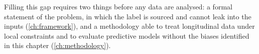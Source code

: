 Filling this gap requires two things before any data are analysed: a formal statement of the problem, in which the label is sourced and cannot leak into the inputs (\cref{ch:framework}), and a methodology able to treat longitudinal data under local constraints and to evaluate predictive models without the biases identified in this chapter (\cref{ch:methodology}).
